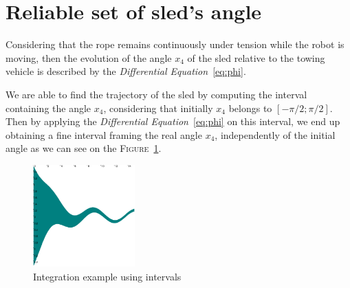 \section*{Reliable set of sled's angle}
    Considering that the rope remains continuously under tension while the robot is moving, then the evolution of the angle $x_4$ of the sled relative to the towing vehicle is described by the \textit{Differential Equation}~\ref{eq:phi}.

    We are able to find the trajectory of the sled by computing the interval containing the angle $x_4$, considering that initially $x_4$ belongs to $[-\pi/2; \pi/2]$. Then by applying the \textit{Differential Equation}~\ref{eq:phi} on this interval, we end up obtaining a fine interval framing the real angle $x_4$, independently of the initial angle as we can see on the \textsc{Figure}~\ref{fig:integration}.

    \begin{figure}[!htb]
        \centering
        \includegraphics[width=0.35\textwidth]{imgs/integration_example.png}
        \caption{\label{fig:integration} Integration example using intervals}
    \end{figure}